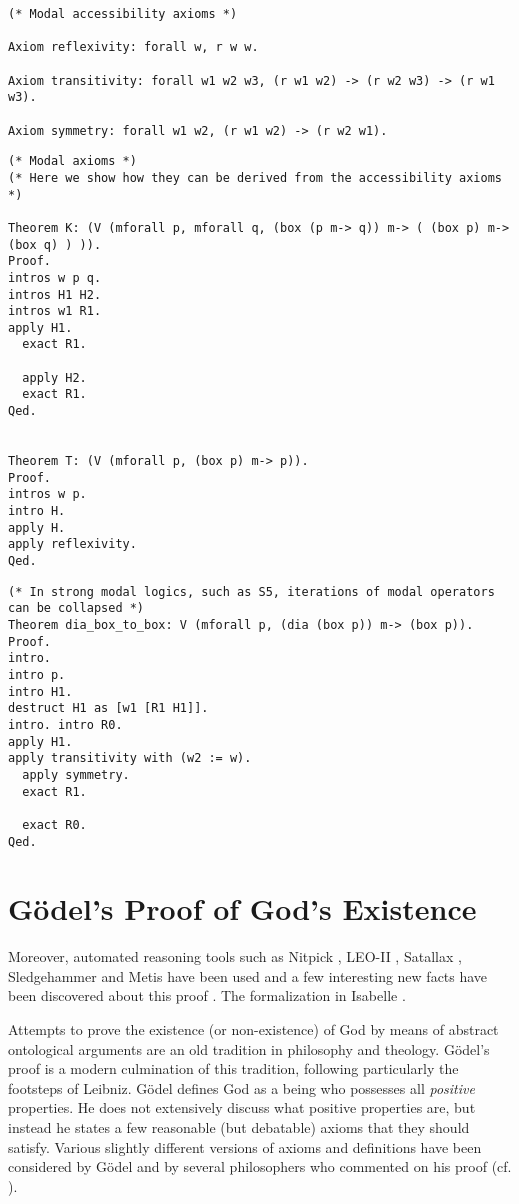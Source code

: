 \documentclass{llncs}
\begin{document}
\begin{verbatim}
(* Modal accessibility axioms *)

Axiom reflexivity: forall w, r w w.

Axiom transitivity: forall w1 w2 w3, (r w1 w2) -> (r w2 w3) -> (r w1 w3).

Axiom symmetry: forall w1 w2, (r w1 w2) -> (r w2 w1).
\end{verbatim}

\begin{verbatim}
(* Modal axioms *)
(* Here we show how they can be derived from the accessibility axioms *)

Theorem K: (V (mforall p, mforall q, (box (p m-> q)) m-> ( (box p) m-> (box q) ) )).
Proof.
intros w p q.
intros H1 H2.
intros w1 R1.
apply H1.
  exact R1.

  apply H2.
  exact R1.
Qed.


Theorem T: (V (mforall p, (box p) m-> p)).
Proof.
intros w p.
intro H.
apply H.
apply reflexivity.
Qed.  
\end{verbatim}


\begin{verbatim}
(* In strong modal logics, such as S5, iterations of modal operators can be collapsed *)
Theorem dia_box_to_box: V (mforall p, (dia (box p)) m-> (box p)).
Proof.
intro.
intro p.
intro H1.
destruct H1 as [w1 [R1 H1]].
intro. intro R0.
apply H1.
apply transitivity with (w2 := w).
  apply symmetry.
  exact R1.

  exact R0.
Qed.
\end{verbatim}


\section{G\"odel's Proof of God's Existence}
\label{sec:proof}

Moreover, automated reasoning tools such as Nitpick \cite{Nitpick}, LEO-II \cite{LEO-II}, Satallax \cite{Satallax}, Sledgehammer \cite{Sledgehammer} and Metis \cite{Hurd03first-orderproof} have been used and a few interesting new facts have been discovered about this proof \cite{TodO:ArXiv or Journal abstract}. The formalization in Isabelle \cite{ToDo:ArchiveFormalProofs}.

Attempts to prove the existence (or non-existence) of God by means of
abstract ontological arguments are an old tradition in philosophy and
theology.  G\"{o}del's proof \cite{Goedel1970,GoedelNotes} is a modern culmination of
this tradition, following particularly the footsteps of Leibniz.
%
G\"{o}del defines God as a being who possesses all \emph{positive} properties.
He does not extensively discuss what positive properties are, 
but instead he states a few reasonable (but debatable) axioms that they should satisfy.
Various slightly different versions of axioms and definitions have
been considered by G\"{o}del and by several philosophers who commented
on his proof
(cf. \cite{sobel2004logic,AndersonGettings,Fitting,Adams,ContemporaryBibliography}). 
\end{document}
